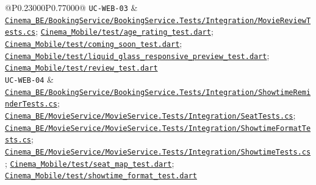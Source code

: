 \begin{longtable}{@{}P{0.23000\SRSWidth}P{0.77000\SRSWidth}@{}}
\texttt{UC-\allowbreak{}WEB-\allowbreak{}03} & \href{../../../Cinema\_BE/BookingService/BookingService.Tests/Integration/MovieReviewTests.cs}{\texttt{Cinema\_\allowbreak{}BE/\allowbreak{}Booking\allowbreak{}Service/\allowbreak{}Booking\allowbreak{}Service.\allowbreak{}Tests/\allowbreak{}Integrat\allowbreak{}ion/\allowbreak{}Movie\allowbreak{}Review\allowbreak{}Tests.\allowbreak{}cs}}; \href{../../../Cinema\_Mobile/test/age\_rating\_test.dart}{\texttt{Cinema\_\allowbreak{}Mobile/\allowbreak{}test/\allowbreak{}age\_\allowbreak{}rating\_\allowbreak{}test.\allowbreak{}dart}}; \href{../../../Cinema\_Mobile/test/coming\_soon\_test.dart}{\texttt{Cinema\_\allowbreak{}Mobile/\allowbreak{}test/\allowbreak{}coming\_\allowbreak{}soon\_\allowbreak{}test.\allowbreak{}dart}}; \href{../../../Cinema\_Mobile/test/liquid\_glass\_responsive\_preview\_test.dart}{\texttt{Cinema\_\allowbreak{}Mobile/\allowbreak{}test/\allowbreak{}liquid\_\allowbreak{}glass\_\allowbreak{}responsi\allowbreak{}ve\_\allowbreak{}preview\_\allowbreak{}test.\allowbreak{}dart}}; \href{../../../Cinema\_Mobile/test/review\_test.dart}{\texttt{Cinema\_\allowbreak{}Mobile/\allowbreak{}test/\allowbreak{}review\_\allowbreak{}test.\allowbreak{}dart}} \\[3pt]
\texttt{UC-\allowbreak{}WEB-\allowbreak{}04} & \href{../../../Cinema\_BE/BookingService/BookingService.Tests/Integration/ShowtimeReminderTests.cs}{\texttt{Cinema\_\allowbreak{}BE/\allowbreak{}Booking\allowbreak{}Service/\allowbreak{}Booking\allowbreak{}Service.\allowbreak{}Tests/\allowbreak{}Integrat\allowbreak{}ion/\allowbreak{}Showtime\allowbreak{}Reminder\allowbreak{}Tests.\allowbreak{}cs}}; \href{../../../Cinema\_BE/MovieService/MovieService.Tests/Integration/SeatTests.cs}{\texttt{Cinema\_\allowbreak{}BE/\allowbreak{}Movie\allowbreak{}Service/\allowbreak{}Movie\allowbreak{}Service.\allowbreak{}Tests/\allowbreak{}Integrat\allowbreak{}ion/\allowbreak{}Seat\allowbreak{}Tests.\allowbreak{}cs}}; \href{../../../Cinema\_BE/MovieService/MovieService.Tests/Integration/ShowtimeFormatTests.cs}{\texttt{Cinema\_\allowbreak{}BE/\allowbreak{}Movie\allowbreak{}Service/\allowbreak{}Movie\allowbreak{}Service.\allowbreak{}Tests/\allowbreak{}Integrat\allowbreak{}ion/\allowbreak{}Showtime\allowbreak{}Format\allowbreak{}Tests.\allowbreak{}cs}}; \href{../../../Cinema\_BE/MovieService/MovieService.Tests/Integration/ShowtimeTests.cs}{\texttt{Cinema\_\allowbreak{}BE/\allowbreak{}Movie\allowbreak{}Service/\allowbreak{}Movie\allowbreak{}Service.\allowbreak{}Tests/\allowbreak{}Integrat\allowbreak{}ion/\allowbreak{}Showtime\allowbreak{}Tests.\allowbreak{}cs}}; \href{../../../Cinema\_Mobile/test/seat\_map\_test.dart}{\texttt{Cinema\_\allowbreak{}Mobile/\allowbreak{}test/\allowbreak{}seat\_\allowbreak{}map\_\allowbreak{}test.\allowbreak{}dart}}; \href{../../../Cinema\_Mobile/test/showtime\_format\_test.dart}{\texttt{Cinema\_\allowbreak{}Mobile/\allowbreak{}test/\allowbreak{}showtime\allowbreak{}\_\allowbreak{}format\_\allowbreak{}test.\allowbreak{}dart}} \\[3pt]

\end{longtable}
